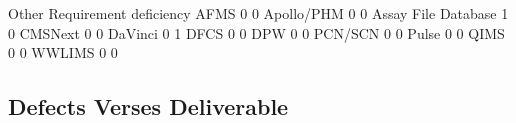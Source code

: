 \documentclass{article}
\begin{document}
\begin{Schunk}
\begin{Soutput}
                      Other Requirement deficiency
  AFMS                    0                      0
  Apollo/PHM              0                      0
  Assay File Database     1                      0
  CMSNext                 0                      0
  DaVinci                 0                      1
  DFCS                    0                      0
  DPW                     0                      0
  PCN/SCN                 0                      0
  Pulse                   0                      0
  QIMS                    0                      0
  WWLIMS                  0                      0
\end{Soutput}
\end{Schunk}

\subsection{Defects Verses Deliverable}
\end{document}
